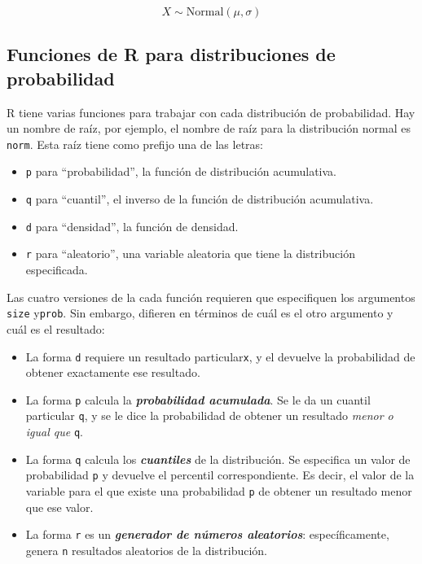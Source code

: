 \documentclass[
]{book}
\providecommand{\tightlist}{%
  \setlength{\itemsep}{0pt}\setlength{\parskip}{0pt}}
\begin{document}
\[
X \sim \mbox{Normal}(\mu,\sigma)
\]

\hypertarget{funciones-de-r-para-distribuciones-de-probabilidad}{%
\subsection{Funciones de R para distribuciones de probabilidad}\label{funciones-de-r-para-distribuciones-de-probabilidad}}

R tiene varias funciones para trabajar con cada distribución de probabilidad. Hay un nombre de raíz, por ejemplo, el nombre de raíz para la distribución normal es \texttt{norm}. Esta raíz tiene como prefijo una de las letras:

\begin{itemize}
\tightlist
\item
  \texttt{p} para ``probabilidad'', la función de distribución acumulativa.
\item
  \texttt{q} para ``cuantil'', el inverso de la función de distribución acumulativa.
\item
  \texttt{d} para ``densidad'', la función de densidad.
\item
  \texttt{r} para ``aleatorio'', una variable aleatoria que tiene la distribución especificada.
\end{itemize}

Las cuatro versiones de la cada función requieren que especifiquen los argumentos \texttt{size} y\texttt{prob}. Sin embargo, difieren en términos de cuál es el otro argumento y cuál es el resultado:

\begin{itemize}
\tightlist
\item
  La forma \texttt{d} requiere un resultado particular\texttt{x}, y el devuelve la probabilidad de obtener exactamente ese resultado.
\item
  La forma \texttt{p} calcula la \textbf{\emph{probabilidad acumulada}}. Se le da un cuantil particular \texttt{q}, y se le dice la probabilidad de obtener un resultado \emph{menor o igual que} \texttt{q}.
\item
  La forma \texttt{q} calcula los \textbf{\emph{cuantiles}} de la distribución. Se especifica un valor de probabilidad \texttt{p} y devuelve el percentil correspondiente. Es decir, el valor de la variable para el que existe una probabilidad \texttt{p} de obtener un resultado menor que ese valor.
\item
  La forma \texttt{r} es un \textbf{\emph{generador de números aleatorios}}: específicamente, genera \texttt{n} resultados aleatorios de la distribución.
\end{itemize}
\end{document}
